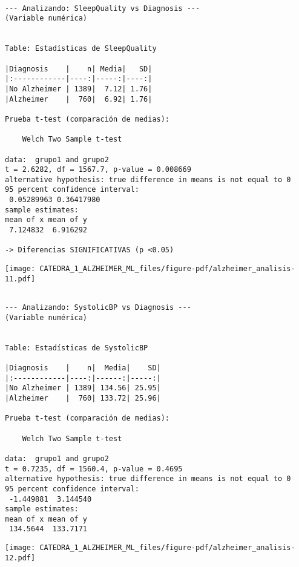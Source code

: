 \documentclass[
  letterpaper,
  DIV=11,
  numbers=noendperiod]{scrartcl}
\begin{document}
\begin{verbatim}

--- Analizando: SleepQuality vs Diagnosis ---
(Variable numérica)


Table: Estadísticas de SleepQuality

|Diagnosis    |    n| Media|   SD|
|:------------|----:|-----:|----:|
|No Alzheimer | 1389|  7.12| 1.76|
|Alzheimer    |  760|  6.92| 1.76|

Prueba t-test (comparación de medias):

    Welch Two Sample t-test

data:  grupo1 and grupo2
t = 2.6282, df = 1567.7, p-value = 0.008669
alternative hypothesis: true difference in means is not equal to 0
95 percent confidence interval:
 0.05289963 0.36417980
sample estimates:
mean of x mean of y 
 7.124832  6.916292 

-> Diferencias SIGNIFICATIVAS (p <0.05)
\end{verbatim}

\begin{center}
\texttt{[image: CATEDRA\_1\_ALZHEIMER\_ML\_files/figure-pdf/alzheimer\_analisis-11.pdf]}
\end{center}

\begin{verbatim}

--- Analizando: SystolicBP vs Diagnosis ---
(Variable numérica)


Table: Estadísticas de SystolicBP

|Diagnosis    |    n|  Media|    SD|
|:------------|----:|------:|-----:|
|No Alzheimer | 1389| 134.56| 25.95|
|Alzheimer    |  760| 133.72| 25.96|

Prueba t-test (comparación de medias):

    Welch Two Sample t-test

data:  grupo1 and grupo2
t = 0.7235, df = 1560.4, p-value = 0.4695
alternative hypothesis: true difference in means is not equal to 0
95 percent confidence interval:
 -1.449881  3.144540
sample estimates:
mean of x mean of y 
 134.5644  133.7171 
\end{verbatim}

\begin{center}
\texttt{[image: CATEDRA\_1\_ALZHEIMER\_ML\_files/figure-pdf/alzheimer\_analisis-12.pdf]}
\end{center}
\end{document}
